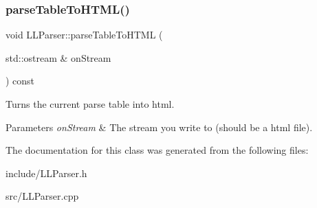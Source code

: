 \subsubsection{\texorpdfstring{parse\+Table\+To\+H\+T\+M\+L()}{parseTableToHTML()}}
{\footnotesize\ttfamily void L\+L\+Parser\+::parse\+Table\+To\+H\+T\+ML (\begin{DoxyParamCaption}\item[{std\+::ostream \&}]{on\+Stream }\end{DoxyParamCaption}) const}



Turns the current parse table into html. 


\begin{DoxyParams}{Parameters}
{\em on\+Stream} & The stream you write to (should be a html file). \\
\hline
\end{DoxyParams}


The documentation for this class was generated from the following files\+:\begin{DoxyCompactItemize}
\item 
include/L\+L\+Parser.\+h\item 
src/L\+L\+Parser.\+cpp\end{DoxyCompactItemize}
